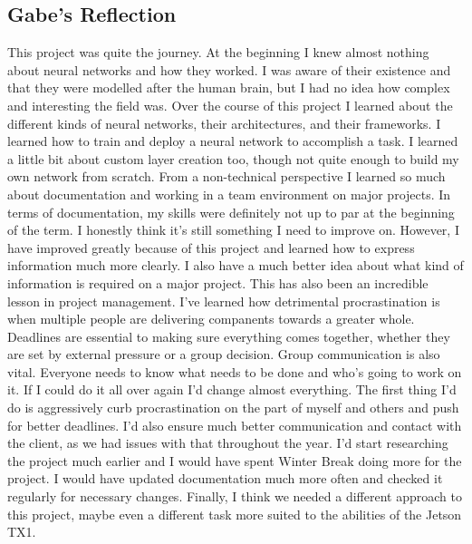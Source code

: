 \documentclass[onecolumn, draftclsnofoot,10pt, compsoc]{IEEEtran}
\begin{document}
\subsection{Gabe's Reflection}
This project was quite the journey.
At the beginning I knew almost nothing about neural networks and how they worked.
I was aware of their existence and that they were modelled after the human brain, but I had no idea how complex and interesting the field was.
Over the course of this project I learned about the different kinds of neural networks, their architectures, and their frameworks.
I learned how to train and deploy a neural network to accomplish a task. 
I learned a little bit about custom layer creation too, though not quite enough to build my own network from scratch.
\newline\newline
From a non-technical perspective I learned so much about documentation and working in a team environment on major projects.
In terms of documentation, my skills were definitely not up to par at the beginning of the term.
I honestly think it's still something I need to improve on.
However, I have improved greatly because of this project and learned how to express information much more clearly.
I also have a much better idea about what kind of information is required on a major project. 
This has also been an incredible lesson in project management. 
I've learned how detrimental procrastination is when multiple people are delivering companents towards a greater whole.
Deadlines are essential to making sure everything comes together, whether they are set by external pressure or a group decision.
Group communication is also vital.
Everyone needs to know what needs to be done and who's going to work on it.
\newline\newline
If I could do it all over again I'd change almost everything.
The first thing I'd do is aggressively curb procrastination on the part of myself and others and push for better deadlines.
I'd also ensure much better communication and contact with the client, as we had issues with that throughout the year.
I'd start researching the project much earlier and I would have spent Winter Break doing more for the project.
I would have updated documentation much more often and checked it regularly for necessary changes.
Finally, I think we needed a different approach to this project, maybe even a different task more suited to the abilities of the Jetson TX1.
\end{document}

